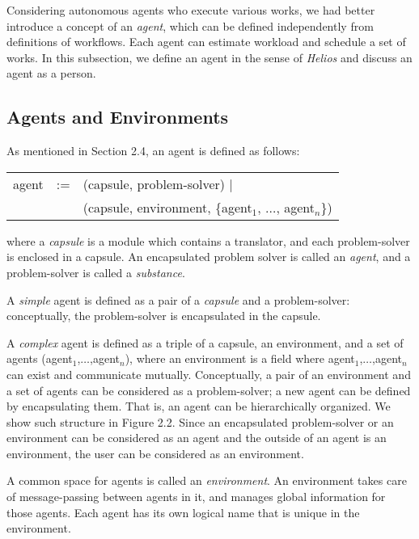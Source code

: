 Considering autonomous agents who execute various works,
we had better introduce a concept of an {\em agent}, which can
be defined independently from definitions of workflows.
Each agent can estimate workload and schedule a set of works.
In this subsection, we define an agent in the sense of {\em Helios}
and discuss an agent as a person.

\subsection{Agents and Environments}

\begin{sloppypar}
 As mentioned in Section 2.4, an agent is defined as follows:
 \begin{center}
 \begin{tabular}{lcl}
 agent	   &:=& (capsule, problem-solver) $|$\\
           &  & (capsule, environment, \{agent$_1$, $\ldots$, agent$_n$\})
 \end{tabular}
 \end{center}
 where a {\em capsule} is a module which contains a translator, and each
 problem-solver is enclosed in a capsule.  An encapsulated problem
 solver is called an {\em agent}, and a problem-solver is called a {\em
 substance}.  
\end{sloppypar}

A {\em simple} agent is defined as a pair of a {\em capsule} and a
problem-solver: conceptually, the problem-solver is encapsulated in
the capsule.

A {\em complex} agent is defined as a triple of a capsule, an
environment, and a set of agents (agent$_1$,$\ldots$,agent$_n$), where
an environment is a field where agent$_1$,$\ldots$,agent$_n$ can exist
and communicate mutually.  Conceptually, a pair of an environment and a
set of agents can be considered as a problem-solver; a new agent can be
defined by encapsulating them.  That is, an agent can be hierarchically
organized.  We show such structure in Figure 2.2.  Since an encapsulated
problem-solver or an environment can be considered as an agent and the
outside of an agent is an environment, the user can be considered as an
environment.

A common space for agents is called an {\em environment}.  An
environment takes care of message-passing between agents in it, and
manages global information for those agents. 
Each agent has its own logical name that is unique in the
environment.

